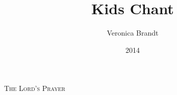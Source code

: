 \documentclass[a5paper, 12pt]{memoir}
\title{Kids Chant}
\author{Veronica Brandt}
\date{2014}
\let\oldtextbf\textbf
\begin{document}
\pagestyle{kidschant}

\setcounter{secnumdepth}{0}

\renewcommand\textbf[1]{%
    \pdfliteral direct {2 Tr 0.2 w}%
     \oldtextbf{#1}%
    \pdfliteral direct {0 Tr 0 w}%
}
\newcommand\embolden[1]{%
    \pdfliteral direct {2 Tr 0.2 w}%
     #1%
    \pdfliteral direct {0 Tr 0 w}%
}
\renewcommand\greboldfont[1]{%
    \pdfliteral direct {2 Tr 0.2 w}%
    \oldtextbf{#1}%
    \pdfliteral direct {0 Tr 0 w}%
}

\begin{center}
\textsc{The Lord's Prayer}
\end{center}

\end{document}
